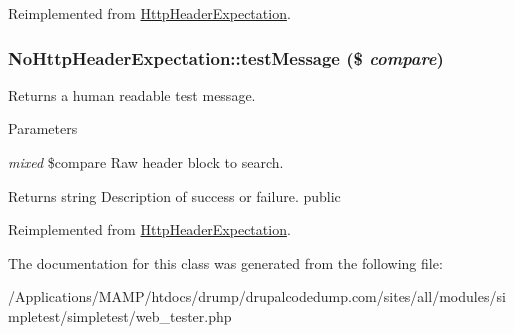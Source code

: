 Reimplemented from \hyperlink{class_http_header_expectation_a22d6de67c863d5f596a90b64b4989637}{HttpHeaderExpectation}.\hypertarget{class_no_http_header_expectation_a5fcd01471616efc71a8e28d2e8380ccb}{
\subsubsection[{testMessage}]{\setlength{\rightskip}{0pt plus 5cm}NoHttpHeaderExpectation::testMessage (\$ {\em compare})}}
\label{class_no_http_header_expectation_a5fcd01471616efc71a8e28d2e8380ccb}
Returns a human readable test message. 
\begin{DoxyParams}{Parameters}
\item[{\em mixed}]\$compare Raw header block to search. \end{DoxyParams}
\begin{DoxyReturn}{Returns}
string Description of success or failure.  public 
\end{DoxyReturn}


Reimplemented from \hyperlink{class_http_header_expectation_ac564586fb079247c33a04e6ead31f8cb}{HttpHeaderExpectation}.

The documentation for this class was generated from the following file:\begin{DoxyCompactItemize}
\item 
/Applications/MAMP/htdocs/drump/drupalcodedump.com/sites/all/modules/simpletest/simpletest/web\_\-tester.php\end{DoxyCompactItemize}

